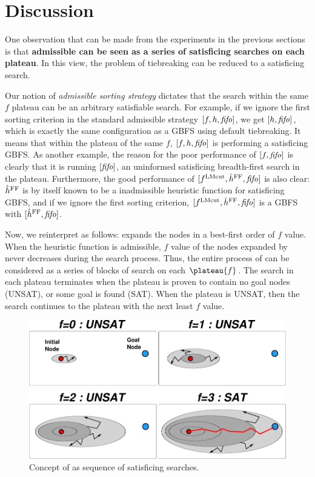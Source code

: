 \clearpage 
\section{Discussion}
\label{sec:discussion}

One observation that can be made from the experiments in the previous sections is that \textbf{admissible \astar
can be seen as a series of satisficing searches on each plateau}. In this view, the problem of tiebreaking can be
reduced to a satisficing search.

Our notion of \emph{admissible sorting strategy} dictates that the
search within the same $f$ plateau can be an arbitrary satisfiable search. For example,
if we ignore the first sorting criterion in the standard admissible strategy
$[f,h,{\text{\textit{fifo}}}]$, we get $[h,{\text{\textit{fifo}}}]$, which is exactly
the same configuration as a GBFS using \fifo default tiebreaking. It
means that within the plateau of the same $f$, $[f,h,{\text{\textit{fifo}}}]$ is
performing a satisficing GBFS.
As another example, the reason for the poor performance of $[f,{\text{\textit{fifo}}}]$
is clearly that it is running $[{\text{\textit{fifo}}}]$,
an uninformed satisficing breadth-first search in the plateau.
Furthermore, the good performance of $[f^{\text{LMcut}},\hat{h}^{\text{FF}},{\text{\textit{fifo}}}]$ is also clear:
$\hat{h}^{\text{FF}}$ is by itself known to be a \sota inadmissible heuristic
function for satisficing GBFS, and 
if we ignore the first sorting criterion, $[f^{\text{LMcut}},\hat{h}^{\text{FF}},{\text{\textit{fifo}}}]$ is a GBFS with $[\hat{h}^{\text{FF}},{\text{\textit{fifo}}}]$.

Now, we reinterpret \astar as follows: \astar expands the nodes in a best-first order of $f$ value. When the
heuristic function is admissible, $f$ value of the nodes expanded by \astar never decreases during the
search process.
Thus, the entire process of \astar can be considered as a series of blocks of search on each $\plateau{f}$.
The search in each plateau terminates when the plateau is proven to contain no goal nodes (UNSAT), or some goal is found (SAT).
When the plateau is UNSAT, then the search continues to the plateau with the next least $f$ value.

\begin{figure}[htbp]
 \includegraphics{img/astar/plateau-5.pdf}
 \caption{Concept of \astar as sequence of satisficing searches.}
\end{figure}

